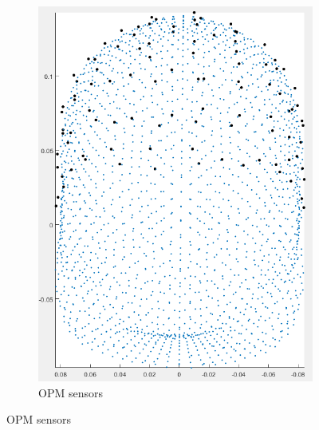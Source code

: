 \documentclass{beamer}
\numberwithin{figure}{section}
\numberwithin{equation}{section}
\begin{document}
\begin{frame}
\begin{figure}[h]
\begin{subfigure}[h]{0.33\linewidth}
            \includegraphics[width=\linewidth]{pictures/opmsen}
            \caption{\scriptsize OPM sensors}
            \label{fig:rdfs_graph}
        \end{subfigure}
    \end{figure}
    
\end{frame}

\end{document}
